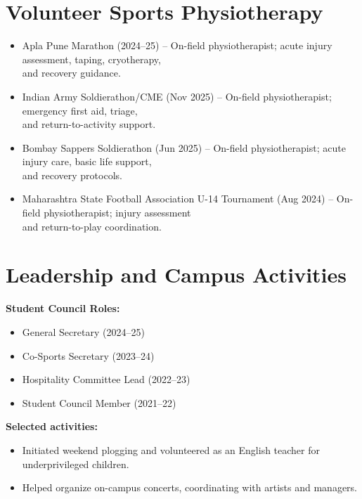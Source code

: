 \documentclass[11pt]{article}
\begin{document}
\section*{Volunteer Sports Physiotherapy}
\begin{itemize}
  \item Apla Pune Marathon (2024--25) -- On-field physiotherapist; acute injury assessment, taping, cryotherapy,\\
  and recovery guidance.
  \item Indian Army Soldierathon/CME (Nov 2025) -- On-field physiotherapist; emergency first aid, triage,\\
  and return-to-activity support.
  \item Bombay Sappers Soldierathon (Jun 2025) -- On-field physiotherapist; acute injury care, basic life support,\\
  and recovery protocols.
  \item Maharashtra State Football Association U-14 Tournament (Aug 2024) -- On-field physiotherapist; injury assessment\\
  and return-to-play coordination.
\end{itemize}

\section*{Leadership and Campus Activities}
\textbf{Student Council Roles:}
\begin{itemize}
  \item General Secretary (2024--25)
  \item Co-Sports Secretary (2023--24)
  \item Hospitality Committee Lead (2022--23)
  \item Student Council Member (2021--22)
\end{itemize}

\textbf{Selected activities:}
\begin{itemize}
  \item Initiated weekend plogging and volunteered as an English teacher for underprivileged children.
  \item Helped organize on-campus concerts, coordinating with artists and managers.
\end{itemize}
\end{document}
